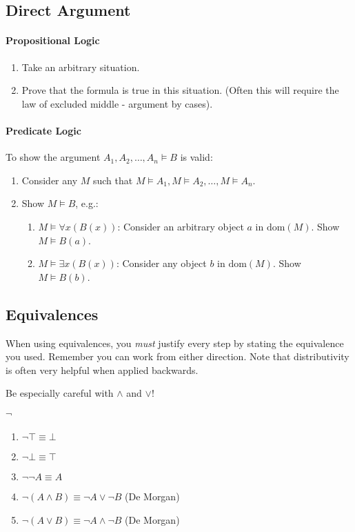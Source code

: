 \documentclass[10pt,twoside,twocolumn]{article}
\begin{document}
\subsection{Direct Argument}


\paragraph{Propositional Logic}
\begin{enumerate}
\item Take an arbitrary situation.
\item Prove that the formula is true in this situation. (Often this will
require the law of excluded middle - argument by cases).
\end{enumerate}

\paragraph{Predicate Logic}

To show the argument $A_{1},A_{2},\dots,A_{n}\vDash B$ is valid:
\begin{enumerate}
\item Consider any $M$ such that $M\vDash A_{1},M\vDash A_{2},\dots,M\vDash A_{n}$.
\item Show $M\vDash B$, e.g.:

\begin{enumerate}
\item $M\vDash\boldsymbol{\forall}x\left(B\left(x\right)\right)$: Consider
an arbitrary object $a$ in $\mbox{dom}\left(M\right)$. Show $M\vDash B\left(a\right)$.
\item $M\vDash\boldsymbol{\exists}x\left(B\left(x\right)\right)$: Consider
any object $b$ in $\mbox{dom}\left(M\right)$. Show $M\vDash B\left(b\right)$.
\end{enumerate}
\end{enumerate}

\subsection{Equivalences}

When using equivalences, you \emph{must} justify every step by stating
the equivalence you used. Remember you can work from either direction. Note that distributivity is often very helpful when applied backwards.

Be especially careful with $\land$ and $\lor$!


\paragraph{$\boldsymbol{\lnot}$}
\begin{enumerate}
\item $\lnot\top\equiv\bot$
\item $\lnot\bot\equiv\top$
\item $\lnot\lnot A\equiv A$
\item $\lnot\left(A\land B\right)\equiv\lnot A\lor\lnot B$ (De Morgan)
\item $\lnot\left(A\lor B\right)\equiv\lnot A\land\lnot B$ (De Morgan)
\end{enumerate}
\end{document}
